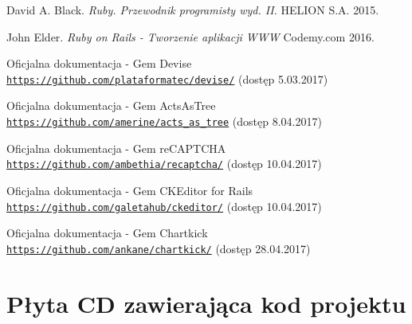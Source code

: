 \documentclass[brudnopis]{xmgr}
\begin{document}
\begin{thebibliography}{9}

David A. Black.
\textit{Ruby. Przewodnik programisty wyd. II.}
HELION S.A. 2015.

John Elder.
\textit{Ruby on Rails - Tworzenie aplikacji WWW}
Codemy.com 2016.

Oficjalna dokumentacja - Gem Devise
\\\texttt{\url{https://github.com/plataformatec/devise/}} (dostęp 5.03.2017)

Oficjalna dokumentacja - Gem ActsAsTree
\\\texttt{\url{https://github.com/amerine/acts_as_tree}} (dostęp 8.04.2017)

Oficjalna dokumentacja - Gem reCAPTCHA
\\\texttt{\url{https://github.com/ambethia/recaptcha/}} (dostęp 10.04.2017)

Oficjalna dokumentacja - Gem CKEditor for Rails
\\\texttt{\url{https://github.com/galetahub/ckeditor/}} (dostęp 10.04.2017)

Oficjalna dokumentacja - Gem Chartkick
\\\texttt{\url{https://github.com/ankane/chartkick/}} (dostęp 28.04.2017)

\end{thebibliography} 

\appendix
\chapter{Płyta CD zawierająca kod projektu}


\listoffigures


\oswiadczenie
\end{document}

